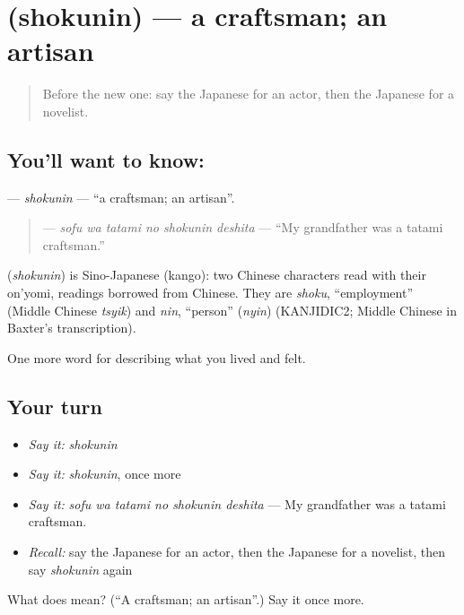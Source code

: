 \section[\texorpdfstring{\ja{しょくにん} (shokunin)}{しょくにん (shokunin)}]{ (shokunin) — a craftsman; an artisan}

\label{lesson:JA-C458-shokunin}



\begin{quote}
Before the new one: say the Japanese for an actor, then the Japanese for a novelist.
\end{quote}

\subsection*{You'll want to know: }
\textbf{} — \emph{shokunin} — \textquotedblleft{}a craftsman; an artisan\textquotedblright{}.

\begin{quote}
\textbf{  } — \emph{sofu wa tatami no shokunin deshita} — \textquotedblleft{}My grandfather was a tatami craftsman.\textquotedblright{}
\end{quote}

\begin{cousinweb}
\textbf{} (\emph{shokunin}) is Sino-Japanese (kango): two Chinese characters read with their on'yomi, readings borrowed from Chinese. They are \emph{shoku}, \textquotedblleft{}employment\textquotedblright{} (Middle Chinese \emph{tsyik}) and \emph{nin}, \textquotedblleft{}person\textquotedblright{} (\emph{nyin}) (KANJIDIC2; Middle Chinese in Baxter's transcription).
\end{cousinweb}

\begin{grammarlens}[title={What you've built}]
One more word for describing what you lived and felt.
\end{grammarlens}

\subsection*{Your turn}
\begin{itemize}
\raggedright
  \item \emph{Say it:} \emph{shokunin}
  \item \emph{Say it:} \emph{shokunin}, once more
  \item \emph{Say it:} \emph{sofu wa tatami no shokunin deshita} — My grandfather was a tatami craftsman.
  \item \emph{Recall:} say the Japanese for an actor, then the Japanese for a novelist, then say \emph{shokunin} again
\end{itemize}

\begin{tcolorbox}[breakable,colback=teal!4,colframe=teal!35!black,title={Before you move on}]
What does  mean? (\textquotedblleft{}A craftsman; an artisan\textquotedblright{}.) Say it once more.
\end{tcolorbox}
